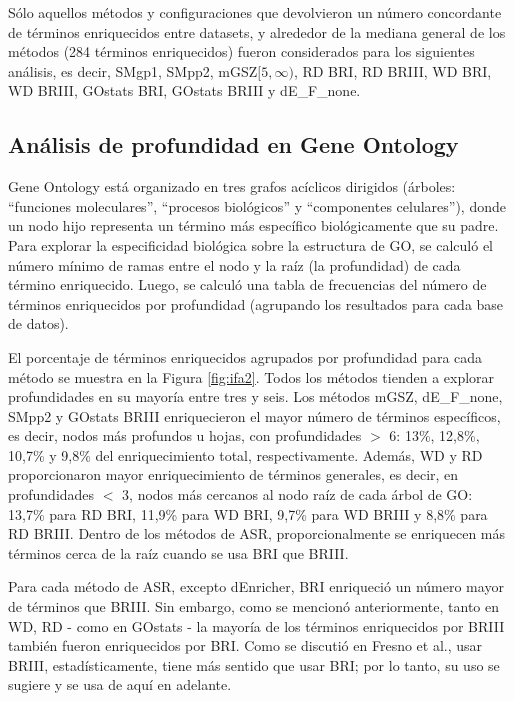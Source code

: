 \documentclass[12pt,twoside]{reedthesis}
\begin{document}
\par

Sólo aquellos métodos y configuraciones que devolvieron un número concordante de términos enriquecidos entre datasets, y alrededor de la mediana general de los métodos (284 términos enriquecidos) fueron considerados para los siguientes análisis, es decir, SMgp1, SMpp2, mGSZ\([5,\infty)\), RD BRI, RD BRIII, WD BRI, WD BRIII, GOstats BRI, GOstats BRIII y dE\_F\_none.

\hypertarget{anuxe1lisis-de-profundidad-en-gene-ontology}{%
\subsection{Análisis de profundidad en Gene Ontology}\label{anuxe1lisis-de-profundidad-en-gene-ontology}}

\par

Gene Ontology está organizado en tres grafos acíclicos dirigidos (árboles: ``funciones moleculares'', ``procesos biológicos'' y ``componentes celulares''), donde un nodo hijo representa un término más específico biológicamente que su padre. Para explorar la especificidad biológica sobre la estructura de GO, se calculó el número mínimo de ramas entre el nodo y la raíz (la profundidad) de cada término enriquecido. Luego, se calculó una tabla de frecuencias del número de términos enriquecidos por profundidad (agrupando los resultados para cada base de datos).

\par

El porcentaje de términos enriquecidos agrupados por profundidad para cada método se muestra en la Figura \ref{fig:ifa2}. Todos los métodos tienden a explorar profundidades en su mayoría entre tres y seis. Los métodos mGSZ, dE\_F\_none, SMpp2 y GOstats BRIII enriquecieron el mayor número de términos específicos, es decir, nodos más profundos u hojas, con profundidades \(>\) 6: 13\%, 12,8\%, 10,7\% y 9,8\% del enriquecimiento total, respectivamente. Además, WD y RD proporcionaron mayor enriquecimiento de términos generales, es decir, en profundidades \(<\) 3, nodos más cercanos al nodo raíz de cada árbol de GO: 13,7\% para RD BRI, 11,9\% para WD BRI, 9,7\% para WD BRIII y 8,8\% para RD BRIII. Dentro de los métodos de ASR, proporcionalmente se enriquecen más términos cerca de la raíz cuando se usa BRI que BRIII.

\par

Para cada método de ASR, excepto dEnricher, BRI enriqueció un número mayor de términos que BRIII. Sin embargo, como se mencionó anteriormente, tanto en WD, RD - como en GOstats - la mayoría de los términos enriquecidos por BRIII también fueron enriquecidos por BRI. Como se discutió en Fresno et al., usar BRIII, estadísticamente, tiene más sentido que usar BRI; por lo tanto, su uso se sugiere y se usa de aquí en adelante.
\end{document}
